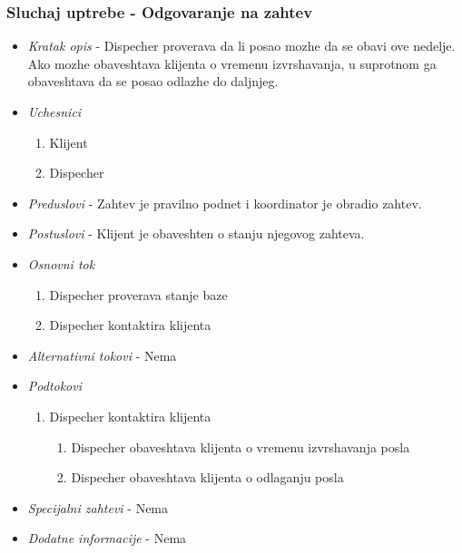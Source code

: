 \documentclass[10 pt]{article}
\begin{document}
	\subsubsection{Sluchaj uptrebe - Odgovaranje na zahtev}
	\begin{itemize}
		
		\item \textit{Kratak opis} -  Dispecher proverava da li posao mozhe da se obavi ove nedelje. Ako mozhe obaveshtava klijenta o vremenu izvrshavanja, u suprotnom ga obaveshtava da se posao odlazhe do daljnjeg.
		
		\item \textit{Uchesnici}
		\begin{enumerate}
			\item Klijent
			\item Dispecher
		\end{enumerate}
		
		\item \textit{Preduslovi} - Zahtev je pravilno podnet i koordinator je obradio zahtev.
		
		\item \textit{Postuslovi} - Klijent je obaveshten o stanju njegovog zahteva.
		
		\item \textit{Osnovni tok}
		\begin{enumerate}
			\item Dispecher proverava stanje baze
			\item Dispecher kontaktira klijenta
		\end{enumerate}
		
		\item \textit{Alternativni tokovi} - Nema
		
		\item \textit{Podtokovi} 
		\begin{enumerate}
				\item Dispecher kontaktira klijenta
				\begin{enumerate}
					\item Dispecher obaveshtava klijenta o vremenu izvrshavanja posla
					\item Dispecher obaveshtava klijenta o odlaganju posla
				\end{enumerate}
		\end{enumerate}
		
		\item \textit{Specijalni zahtevi} - Nema
		
		\item \textit{Dodatne informacije} - Nema
		
	\end{itemize}
	
\end{document}

